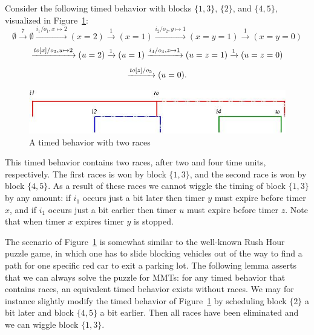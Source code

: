 \begin{example}
\label{no wiggling example}
Consider the following timed behavior with blocks $\{ 1, 3 \}$, $\{ 2 \}$, and $\{ 4, 5 \}$,
visualized in Figure~\ref{fig:races}:
\[
\emptyset \xrightarrow{7} \emptyset \xrightarrow{i_1/o_1, x \mapsto 2} (x=2) \xrightarrow{1} (x=1)
\xrightarrow{i_2/o_2, y \mapsto 1} (x=y=1) \xrightarrow{1} (x=y=0) 
\]
\[
\xrightarrow{\mathit{to}[x]/o_3, u \mapsto 2} (u=2)
\xrightarrow{1} (u=1)
\xrightarrow{i_4/o_4, z \mapsto 1} (u=z=1)
\xrightarrow{1} (u=z=0)
\]
\[
\xrightarrow{\mathit{to}[z]/o_5} (u=0).
\]
\begin{figure}
\begin{center}
\includegraphics[width=.8\textwidth]{wiggling.jpg}
\end{center}
\caption{A timed behavior with two races}
\label{fig:races}
\end{figure}

This timed behavior contains two races, after two and four time units, respectively.
The first races is won by block $\{ 1, 3 \}$, and the second race is won by block $\{ 4, 5 \}$.
As a result of these races we cannot wiggle the timing of block $\{ 1, 3 \}$ by any amount:
if $i_1$ occurs just a bit later then timer $y$ must expire before timer $x$,
and if $i_1$ occurs just a bit earlier then timer $u$ must expire before timer $z$.
Note that when timer $x$ expires timer $y$ is stopped.
\end{example}

The scenario of Figure~\ref{fig:races} is somewhat similar to the well-known Rush Hour puzzle game,
in which one has to slide blocking vehicles out of the way to find a path for one specific red car to exit a parking lot.
The following lemma asserts that we can always solve the puzzle for MMTs: for any timed behavior that contains races,
an equivalent timed behavior exists without races.
We may for instance slightly modify the timed behavior of Figure~\ref{fig:races} by scheduling block $\{ 2  \}$
a bit later and block $\{ 4, 5 \}$ a bit earlier.
Then all races have been eliminated and we can wiggle block $\{ 1, 3 \}$.


